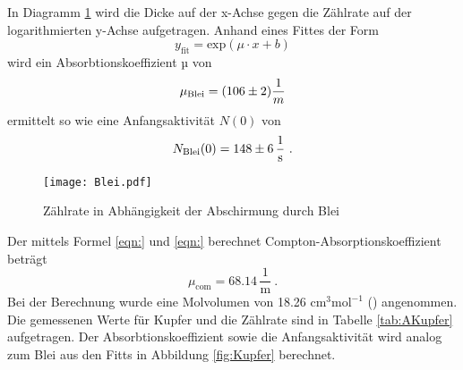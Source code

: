 In Diagramm \ref{fig:Blei} wird die Dicke auf der x-Achse gegen die Zählrate auf der logarithmierten y-Achse aufgetragen. Anhand eines Fittes der Form
\begin{equation}
  y_\text{fit} = \text{exp}(\mu \cdot x + b)
  \label{eqn:fit}
\end{equation}
wird ein Absorbtionskoeffizient µ von
\begin{equation}
  \mu_\text{Blei} = (\num{106 +- 2}) \frac{1}{m}
  \label{eqn:absK}
\end{equation}
ermittelt so wie eine Anfangsaktivität $N(0)$ von
\begin{equation}
  N_\text{Blei}(0) = \num{148 +- 6} \, \frac{1}{\text{s}} \ .
  \label{eqn:NBlei}
\end{equation}
\begin{figure}
  \centering
  \texttt{[image: Blei.pdf]}
  \caption{Zählrate in Abhängigkeit der Abschirmung durch Blei}
  \label{fig:Blei}
\end{figure}
Der mittels Formel \ref{eqn:} und \ref{eqn:} berechnet Compton-Absorptionskoeffizient beträgt
\begin{equation}
  \mu_\text{com} = 68.14 \, \frac{1}{\text{m}} \ .
  \label{eqn:}
\end{equation}
Bei der Berechnung wurde eine Molvolumen von 18.26 $\text{cm}^3\text{mol}^{-1}$ (\cite{Kupfer}) angenommen.
Die gemessenen Werte für Kupfer und die Zählrate sind in Tabelle \ref{tab:AKupfer} aufgetragen. Der Absorbtionskoeffizient sowie die Anfangsaktivität wird analog zum Blei aus den Fitts in Abbildung \ref{fig:Kupfer} berechnet.
